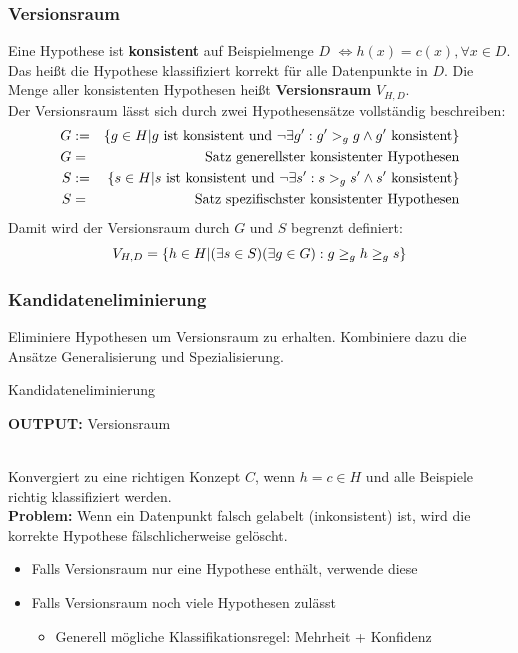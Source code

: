 	\subsubsection{Versionsraum}
	Eine Hypothese ist \textbf{konsistent} auf Beispielmenge $D$ $\Leftrightarrow h(x) = c(x), \forall x \in D$. Das heißt die Hypothese klassifiziert korrekt für alle Datenpunkte in $D$. Die Menge aller konsistenten Hypothesen heißt \textbf{Versionsraum} $V_{H,D}$.\\[5pt]
	Der Versionsraum lässt sich durch zwei Hypothesensätze vollständig beschreiben:
	\begin{eqnarray*}
		G &:=& \{g\in H\vert g \text{ ist konsistent und } \lnot \exists g': g' >_g g \land g' \text{ konsistent}\}\\
		G &=& \text{Satz generellster konsistenter Hypothesen}\\
		S &:=& \{s\in H\vert s \text{ ist konsistent und } \lnot \exists s': s>_g s' \land s' \text{ konsistent}\}\\
		S &=& \text{Satz spezifischster konsistenter Hypothesen}
	\end{eqnarray*}
	Damit wird der Versionsraum durch $G$ und $S$ begrenzt definiert:
	\begin{equation*}
		V_{H,D} = \{h\in H\vert (\exists s \in S)(\exists g \in G): g \ge_g h\ge_g s\}
	\end{equation*}
	\subsubsection{Kandidateneliminierung}
	Eliminiere Hypothesen um Versionsraum zu erhalten. Kombiniere dazu die Ansätze Generalisierung und Spezialisierung.
	\begin{algorithm}
		\caption{Kandidateneliminierung}\label{euclid}
		\begin{flushleft}
			\textbf{OUTPUT:} Versionsraum
		\end{flushleft}
		\begin{algorithmic}[1]
				\EndIf
			\EndFor
		\end{algorithmic}
	\end{algorithm}\\
	Konvergiert zu eine richtigen Konzept $C$, wenn $h=c \in H$ und alle Beispiele richtig klassifiziert werden.\\[5pt]
	\textbf{Problem:} Wenn ein Datenpunkt falsch gelabelt (inkonsistent) ist, wird die korrekte Hypothese fälschlicherweise gelöscht.
	\begin{itemize}
		\item Falls Versionsraum nur eine Hypothese enthält, verwende diese
		\item Falls Versionsraum noch viele Hypothesen zulässt
		\begin{itemize}
			\item Generell mögliche Klassifikationsregel: Mehrheit + Konfidenz
		\end{itemize}
	\end{itemize}

